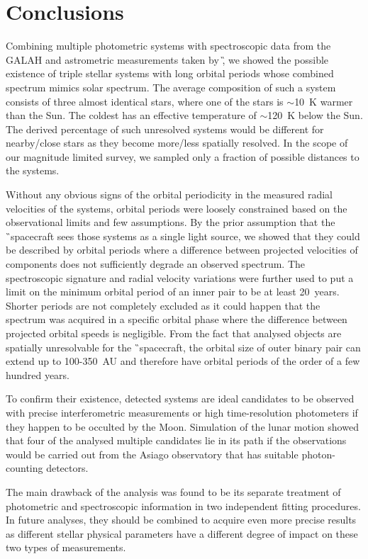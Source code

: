 \section{Conclusions}
\label{sec:concl}
Combining multiple photometric systems with spectroscopic data from the GALAH and astrometric measurements taken by \G, we showed the possible existence of triple stellar systems with long orbital periods whose combined spectrum mimics solar spectrum. The average composition of such a system consists of three almost identical stars, where one of the stars is $\sim$10~K warmer than the Sun. The coldest has an effective temperature of $\sim$120~K below the Sun. The derived percentage of such unresolved systems would be different for nearby/close stars as they become more/less spatially resolved. In the scope of our magnitude limited survey, we sampled only a fraction of possible distances to the systems.

Without any obvious signs of the orbital periodicity in the measured radial velocities of the systems, orbital periods were loosely constrained based on the observational limits and few assumptions. By the prior assumption that the \G\ spacecraft sees those systems as a single light source, we showed that they could be described by orbital periods where a difference between projected velocities of components does not sufficiently degrade an observed spectrum. The spectroscopic signature and radial velocity variations were further used to put a limit on the minimum orbital period of an inner pair to be at least 20~years. Shorter periods are not completely excluded as it could happen that the spectrum was acquired in a specific orbital phase where the difference between projected orbital speeds is negligible. From the fact that analysed objects are spatially unresolvable for the \G\ spacecraft, the orbital size of outer binary pair can extend up to 100-350~AU and therefore have orbital periods of the order of a few hundred years.

To confirm their existence, detected systems are ideal candidates to be observed with precise interferometric measurements or high time-resolution photometers if they happen to be occulted by the Moon. Simulation of the lunar motion showed that four of the analysed multiple candidates lie in its path if the observations would be carried out from the Asiago observatory that has suitable photon-counting detectors.

The main drawback of the analysis was found to be its separate treatment of photometric and spectroscopic information in two independent fitting procedures. In future analyses, they should be combined to acquire even more precise results as different stellar physical parameters have a different degree of impact on these two types of measurements.

